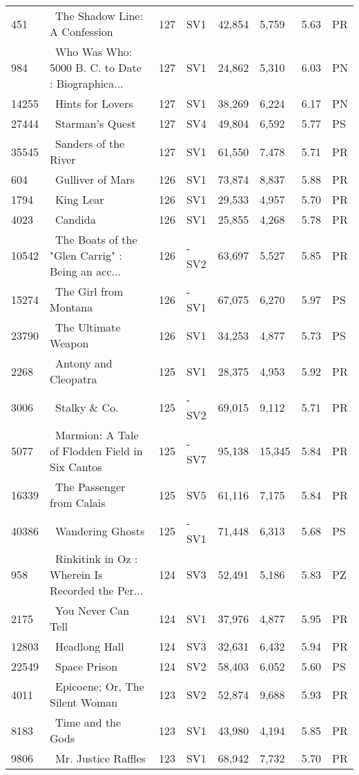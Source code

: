 \begin{longtable}{l | l | l | l | l | l | l | l}
451 & ~The Shadow Line: A Confession & 127 & SV1 & 42,854 & 5,759 & 5.63 & PR\\
984 & ~Who Was Who: 5000 B. C. to Date
: Biographica... & 127 & SV1 & 24,862 & 5,310 & 6.03 & PN\\
14255 & ~Hints for Lovers & 127 & SV1 & 38,269 & 6,224 & 6.17 & PN\\
27444 & ~Starman's Quest & 127 & SV4 & 49,804 & 6,592 & 5.77 & PS\\
35545 & ~Sanders of the River & 127 & SV1 & 61,550 & 7,478 & 5.71 & PR\\
604 & ~Gulliver of Mars & 126 & SV1 & 73,874 & 8,837 & 5.88 & PR\\
1794 & ~King Lear & 126 & SV1 & 29,533 & 4,957 & 5.70 & PR\\
4023 & ~Candida & 126 & SV1 & 25,855 & 4,268 & 5.78 & PR\\
10542 & ~The Boats of the "Glen Carrig"
: Being an acc... & 126 & -SV2 & 63,697 & 5,527 & 5.85 & PR\\
15274 & ~The Girl from Montana & 126 & -SV1 & 67,075 & 6,270 & 5.97 & PS\\
23790 & ~The Ultimate Weapon & 126 & SV1 & 34,253 & 4,877 & 5.73 & PS\\
2268 & ~Antony and Cleopatra & 125 & SV1 & 28,375 & 4,953 & 5.92 & PR\\
3006 & ~Stalky \& Co. & 125 & -SV2 & 69,015 & 9,112 & 5.71 & PR\\
5077 & ~Marmion: A Tale of Flodden Field in Six Cantos & 125 & -SV7 & 95,138 & 15,345 & 5.84 & PR\\
16339 & ~The Passenger from Calais & 125 & SV5 & 61,116 & 7,175 & 5.84 & PR\\
40386 & ~Wandering Ghosts & 125 & -SV1 & 71,448 & 6,313 & 5.68 & PS\\
958 & ~Rinkitink in Oz
: Wherein Is Recorded the Per... & 124 & SV3 & 52,491 & 5,186 & 5.83 & PZ\\
2175 & ~You Never Can Tell & 124 & SV1 & 37,976 & 4,877 & 5.95 & PR\\
12803 & ~Headlong Hall & 124 & SV3 & 32,631 & 6,432 & 5.94 & PR\\
22549 & ~Space Prison & 124 & SV2 & 58,403 & 6,052 & 5.60 & PS\\
4011 & ~Epicoene; Or, The Silent Woman & 123 & SV2 & 52,874 & 9,688 & 5.93 & PR\\
8183 & ~Time and the Gods & 123 & SV1 & 43,980 & 4,194 & 5.85 & PR\\
9806 & ~Mr. Justice Raffles & 123 & SV1 & 68,942 & 7,732 & 5.70 & PR\\

\end{longtable}
